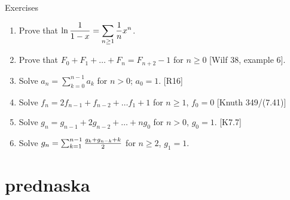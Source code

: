 \documentclass[10pt, a4paper]{article}
\def\ans#1{\big[\hskip 2mm {#1}\hskip 2mm\big]}
\begin{document}
Exercises
\begin{enumerate}
    \item Prove that $\displaystyle \ln {1\over 1-x} = \sum_{n\ge 1} {1\over n} x^n$. \ans{consider $\int {1\over 1-x}$}
    \item Prove that $F_0+F_1+\dots+F_n=F_{n+2}-1$ for $n\ge 0$ [Wilf 38, example 6].\\ \ans{Compare gfs of both sides, left is $f/(1-x)$, where $f = x/(1-x-x^2)$, i.e. Fibonacci.}
    \item Solve $a_n = \sum_{k=0}^{n-1}a_k$ for $n > 0$; $a_0 = 1$. [R16] \ans{$a_n = 2^{n-1}$ for $n \ge 1$}
    \item Solve $f_n=2f_{n-1}+f_{n-2}+\dots f_1+1$ for $n\ge 1$, $f_0 = 0$ [Knuth 349/(7.41)]\\ \ans{$F(x) = x/(1-3x+x^2)$; $f_n=F_{2n}$}
    \item Solve $g_n = g_{n-1} + 2g_{n-2}+\dots +ng_0$ for $n> 0$, $g_0 = 1$. [K7.7]\\       \ans{$G(x)=1+x/(1-3x+x^2)$; $g_n=F_{2n} + [n=0]$}
    \item Solve $g_n = \sum_{k=1}^{n-1} {g_k + g_{n-k} + k\over 2}$ for $n\ge 2$, $g_1 = 1$.
\end{enumerate}



\section{prednaska}
\end{document}
